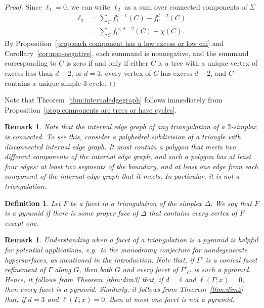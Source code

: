 \documentclass[10pt]{amsart}
\newtheorem{defi}[theorem]{Definition}
\newtheorem{rema}[theorem]{Remark}
\newcommand{\eg}{e.g.\ }
\begin{document}
\begin{proof}
Since $\ell_1 = 0$, we can write $\ell_2$ as a sum over connected components of $\Sigma$
\begin{align*}
\ell_2 & = \sum_C f_1^{d-1}(C) - f_0^{d-2}(C)\\
& = \sum_C f_0^{< d-2}(C) - \chi(C).
\end{align*}
By Proposition~\ref{prop:each component has a low excess or low chi} and Corollary~\ref{cor:non-negative}, each summand is nonnegative, and the summand corresponding to $C$ is zero if and only if either $C$ is a tree with a unique vertex of excess less than $d-2$, or $d=3$, every vertex of $C$ has excess $d-2$, and $C$ contains a unique simple 3-cycle.
\end{proof}


Note that Theorem~\ref{thm:internaledgegraph} follows immediately from Proposition~\ref{prop:components are trees or have cycles}.

\begin{rema} \label{rem:connected}
Note that the internal edge graph of any triangulation of a $2$-simplex is connected. To see this, consider a polyhedral subdivision of a triangle with disconnected internal edge graph. It must contain a polygon that meets two different components of the internal edge graph, and such a polygon has at least four edges: at least two segments of the boundary, and at least one edge from each component of the internal edge graph that it meets. In particular, it is not a triangulation.
\end{rema}

\begin{defi}
Let $F$ be a facet in a triangulation of the simplex $\Delta$. 
We say that $F$ is a \emph{pyramid} if there is some proper face of $\Delta$ that 
contains every vertex of $F$ except one.
\end{defi}

\begin{rema} \label{rem:pyramids}
Understanding when a facet of a triangulation is a pyramid is helpful for potential 
applications, \eg to the monodromy conjecture for nondegenerate hypersurfaces, as 
mentioned in the introduction. Note that, if $\Gamma'$ is a conical facet refinement of 
$\Gamma$ along $G$, then both $G$ and every facet of $\Gamma'_G$ is such a pyramid. Hence, 
it follows from Theorem~\ref{thm:dim3} that, if $d = 4$ and $\ell(\Gamma;x) = 0$, then every facet is 
a pyramid. Similarly, it follows from Theorem~\ref{thm:dim2} that, if $d = 3$ and 
$\ell(\Gamma;x) = 0$, then at most one facet is not a pyramid. 
\end{rema}
\end{document}
